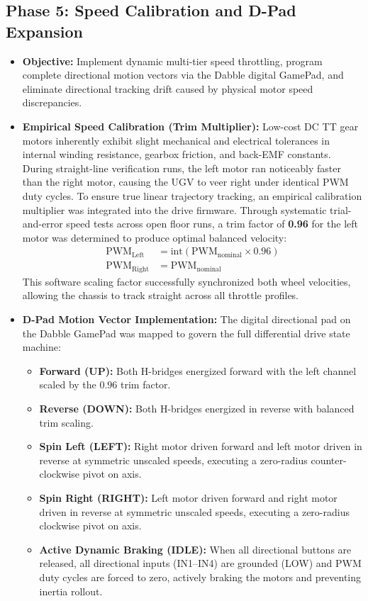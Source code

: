 \documentclass[journal,12pt,onecolumn]{IEEEtran}
\begin{document}
\subsection*{\textbf{Phase 5}: Speed Calibration and D-Pad Expansion}
\begin{itemize}
	\item \textbf{Objective:} Implement dynamic multi-tier speed throttling, program complete directional motion vectors via the Dabble digital GamePad, and eliminate directional tracking drift caused by physical motor speed discrepancies. %
	
	\item \textbf{Empirical Speed Calibration (Trim Multiplier):} Low-cost DC TT gear motors inherently exhibit slight mechanical and electrical tolerances in internal winding resistance, gearbox friction, and back-EMF constants. %
	During straight-line verification runs, the left motor ran noticeably faster than the right motor, causing the UGV to veer right under identical PWM duty cycles. %
	To ensure true linear trajectory tracking, an empirical calibration multiplier was integrated into the drive firmware. %
	Through systematic trial-and-error speed tests across open floor runs, a trim factor of \textbf{0.96} for the left motor was determined to produce optimal balanced velocity:
	\begin{align}
		\text{PWM}_{\text{Left}} &= \text{int}\left(\text{PWM}_{\text{nominal}} \times 0.96\right) \\
		\text{PWM}_{\text{Right}} &= \text{PWM}_{\text{nominal}}
	\end{align}
	This software scaling factor successfully synchronized both wheel velocities, allowing the chassis to track straight across all throttle profiles. %
	
	\item \textbf{D-Pad Motion Vector Implementation:} The digital directional pad on the Dabble GamePad was mapped to govern the full differential drive state machine: %
	\begin{itemize}
		\item \textbf{Forward (UP):} Both H-bridges energized forward with the left channel scaled by the $0.96$ trim factor. %
		\item \textbf{Reverse (DOWN):} Both H-bridges energized in reverse with balanced trim scaling. %
		\item \textbf{Spin Left (LEFT):} Right motor driven forward and left motor driven in reverse at symmetric unscaled speeds, executing a zero-radius counter-clockwise pivot on axis. %
		\item \textbf{Spin Right (RIGHT):} Left motor driven forward and right motor driven in reverse at symmetric unscaled speeds, executing a zero-radius clockwise pivot on axis. %
		\item \textbf{Active Dynamic Braking (IDLE):} When all directional buttons are released, all directional inputs (IN1--IN4) are grounded (LOW) and PWM duty cycles are forced to zero, actively braking the motors and preventing inertia rollout. %
	\end{itemize}
	

\end{itemize}
\end{document}
